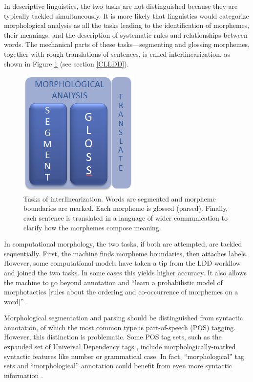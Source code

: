 \documentclass[12pt]{article}
\begin{document}
In descriptive linguistics, the two tasks are not distinguished because they are typically tackled simultaneously. It is more likely that linguistics would categorize morphological analysis as all the tasks leading to the identification of morphemes, their meanings, and the description of systematic rules and relationships between words. The mechanical parts of these tasks---segmenting and glossing morphemes, together with rough translations of sentences, is called interlinearization, as shown in Figure \ref{fig:IGT} (see section \ref{CLLDD}).

\begin{figure}[ht]
\begin{center}
\includegraphics[width=0.3\columnwidth]{IGT.PNG}
\caption{Tasks of interlinearization. Words are segmented and morpheme boundaries are marked. Each morpheme is glossed (parsed). Finally, each sentence is translated in a language of wider communication to clarify how the morphemes compose meaning.}
\label{fig:IGT}
\end{center}
\end{figure}
 
In computational morphology, the two tasks, if both are attempted, are tackled sequentially. First, the machine finds morpheme boundaries, then attaches labels. However, some computational models have taken a tip from the LDD workflow and joined the two tasks. In some cases this yields higher accuracy. It also allows the machine to go beyond annotation and ``learn a probabilistic model of morphotactics [rules about the ordering and co-occurrence of morphemes on a word]'' \cite[p. 165]{cotterell_labeled_2015}.

Morphological segmentation and parsing should be distinguished from syntactic annotation, of which the most common type is part-of-speech (POS) tagging. However, this distinction is problematic. Some POS tag sets, such as the expanded set of Universal Dependency tags \cite{de_marneffe_universal_2014}, include morphologically-marked syntactic features like number or grammatical case. In fact, ``morphological'' tag sets and ``morphological'' annotation could benefit from even more syntactic information \cite{cotterell_cross-lingual_2017}. 
\end{document}
